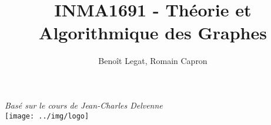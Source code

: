 

\title{INMA1691 - Théorie et Algorithmique des Graphes}
\author{Beno\^it Legat, Romain Capron}



\maketitle
\begin{center}
  \textit{Basé sur le cours de Jean-Charles Delvenne}\\
  \texttt{[image: ../img/logo]}
\end{center}
\newpage
\clearpage

\tableofcontents
\newpage


\newcommand{\addTODO}
{
  \textcolor{red}{TODO}\stepcounter{todo_\thesection}
}

\newcommand{\Chapitredone}[2]
{
  \ifnum#1=0
    Chapitre #2 terminé!
  \else
    \textbf{#1} dans le Chapitre #2
  \fi
}
\newcommand{\username}[2]
{
  \textit{\textbf{#1}} $\longleftrightarrow$ \textbf{#2}
}














\clearpage
